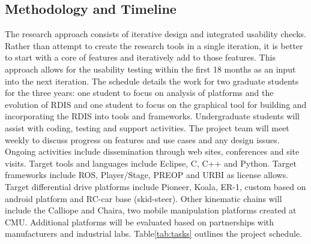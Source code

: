 \subsection{Methodology and Timeline}
The research approach consists of iterative design and integrated usability checks.  Rather than attempt to create the research tools in a single iteration, it is better to start with a core of features and iteratively add to those features. This approach allows for the usability testing within the first 18 months as an input into the next iteration.  The schedule details the work for two graduate students for the three years: one student to focus on analysis of platforms and the evolution of RDIS and one student to focus on the graphical tool for building and incorporating the RDIS into tools and frameworks.  Undergraduate students will assist with coding, testing and support activities.  The project team will meet weekly to discuss progress on features and use cases and any design issues.  Ongoing activities include dissemination through web sites, conferences and site visits.    Target tools and languages include Eclipse, C, C++ and Python.  Target frameworks include ROS, Player/Stage, PREOP and URBI as license allows.  Target differential drive platforms include Pioneer, Koala, ER-1, custom based on android platform and RC-car base (skid-steer).  Other kinematic chains will include the Calliope and Chaira, two mobile manipulation platforms created at CMU.  Additional platforms will be evaluated based on partnerships with manufacturers and industrial labs.
Table\ref{tab:tasks} outlines the project schedule.
%
